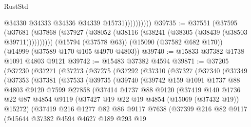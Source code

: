 \begin{lexlean}{RustStd}
\begin{coremodule}
                        @34330
                        @34333
                        @34336
                        @34339
                        @15731))))))))))
@39735 := @37551
    (@37595 (@37681 (@37868 (@37927 (@38052 (@38116 (@38241 (@38305 (@38439 (@38503 @39711))))))))))
    (@15794 (@37578 @63))
    (@15090 (@37582 @682 @170))
    (@14999 (@37589 @170 @105 @4970 @4803))
@39740 := @15833 @37382 @1738 @1091 @4803 @9121
@39742 := @15483 @37382 @4594
@39871 := @37205
    (@37230
      (@37271
        (@37273
          (@37275
            (@37292
              (@37310
                (@37327
                  (@37340
                    (@37349
                      (@37353
                        (@37381
                          (@37533
                            (@39735
                              (@39740
                                (@39742
                                  @159
                                  @1091
                                  @1737
                                  @88
                                  @4803
                                  @9120
                                  @7599
                                  @27858
                                  (@37414
                                    @1737
                                    @88
                                    @9120
                                    (@37419
                                      @140
                                      @1736
                                      @22
                                      @87
                                      @4854
                                      @9119
                                      (@37427 @19 @22 @19 @4854 (@15069 (@37432 @19)) @15272)
                                      (@37419
                                        @216
                                        @1277
                                        @82
                                        @86
                                        @9117
                                        @7638
                                        (@37399
                                          @216
                                          @82
                                          @9117
                                          (@15644
                                            @37382
                                            @4594
                                            @4627
                                            @189
                                            @293
                                            @19

\end{coremodule}
\end{lexlean}
